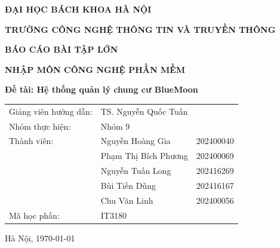 ﻿\documentclass[12pt,a4paper]{report}
\newcommand{\topic}{Hệ thống quản lý chung cư BlueMoon}
\begin{document}
\begin{titlepage}
\centering

{\fontsize{18pt}{22pt}\selectfont\bfseries
ĐẠI HỌC BÁCH KHOA HÀ NỘI
\par}

\vspace{4pt}

{\fontsize{14pt}{20pt}\selectfont\bfseries
TRƯỜNG CÔNG NGHỆ THÔNG TIN VÀ TRUYỀN THÔNG
\par}

\vspace{3cm}

{\fontsize{26pt}{31pt}\selectfont\bfseries
BÁO CÁO BÀI TẬP LỚN
\par}

\vspace{8pt}

{\fontsize{20pt}{27pt}\selectfont\bfseries
NHẬP MÔN CÔNG NGHỆ PHẦN MỀM
\par}

\vspace{1cm}

{\fontsize{20pt}{25pt}\selectfont\bfseries
Đề tài: \topic
\par}

\vspace{3cm}

{\fontsize{15pt}{17pt}\selectfont
\begin{tabular}{lll}
Giảng viên hướng dẫn: & TS. Nguyễn Quốc Tuấn    &             \\
Nhóm thực hiện:       & Nhóm 9                  &             \\
Thành viên:           & Nguyễn Hoàng Gia         & 202400040   \\
                      & Phạm Thị Bích Phương      & 202400069   \\
                      & Nguyễn Tuấn Long           & 202416269   \\
                      & Bùi Tiến Dũng              & 202416167   \\
                      & Chu Văn Linh               & 202400056   \\
Mã học phần:         & IT3180                    &             \\
\end{tabular}
}

\vfill

{\fontsize{14pt}{18pt}\selectfont
Hà Nội, \today
}

\end{titlepage}
\tableofcontents
\listoftables
\listoffigures
\clearpage
\end{document}
